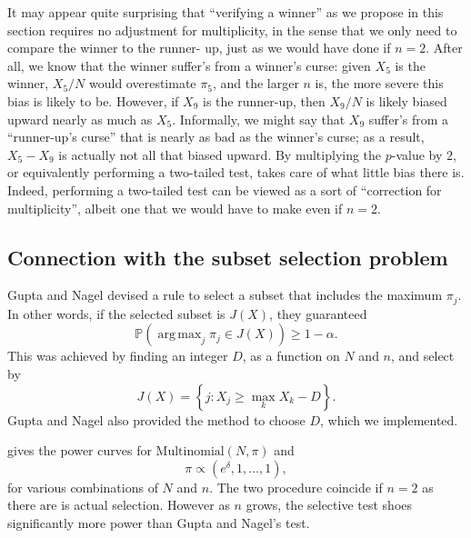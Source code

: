 \documentclass[11pt]{article}
\DeclareMathOperator*{\argmax}{arg\,max}
\newcommand{\PP}{\mathbb{P}}
\begin{document}
It may appear quite surprising that ``verifying a winner'' as we propose in this section requires no adjustment for multiplicity, in the sense that we only need to compare the winner to the runner- up, just as we would have done if $n = 2$. After all, we know that the winner suffer’s from a winner's curse: given $X_5$ is the winner, $X_5 / N$ would overestimate $\pi_5$, and the larger $n$ is, the more severe this bias is likely to be. However, if $X_9$ is the runner-up, then $X_9 / N$ is likely biased upward nearly as much as $X_5$. Informally, we might say that $X_9$ suffer’s from a “runner-up’s curse” that is nearly as bad as the winner's curse; as a result, $X_5 - X_9$ is actually not all that biased upward. By multiplying the $p$-value by $2$, or equivalently performing a two-tailed test, takes care of what little bias there is. Indeed, performing a two-tailed test can be viewed as a sort of ``correction for multiplicity'', albeit one that we would have to make even if $n = 2$.

\subsection{Connection with the subset selection problem}
\label{sec:compare_subset}

Gupta and Nagel \cite{Gupta:1967wg} devised a rule to select a subset that includes the maximum $\pi_j$. In other words, if the selected subset is $J\left(X\right)$, they guaranteed
$$\PP\left(\argmax_j \pi_j \in J\left(X\right)\right) \ge 1 - \alpha.$$
This was achieved by finding an integer $D$, as a function on $N$ and $n$, and select by
$$J\left(X\right) = \left\{j: X_j \ge \max_k X_k - D\right\}.$$
Gupta and Nagel also provided the method to choose $D$, which we implemented. 

 gives the power curves for $\text{Multinomial}\left(N, \pi\right)$ and
$$\pi \propto \left(e^\delta, 1, \ldots, 1\right),$$
for various combinations of $N$ and $n$. The two procedure coincide if $n = 2$ as there are is actual selection. However as $n$ grows, the selective test shoes significantly more power than Gupta and Nagel's test.
\end{document}
